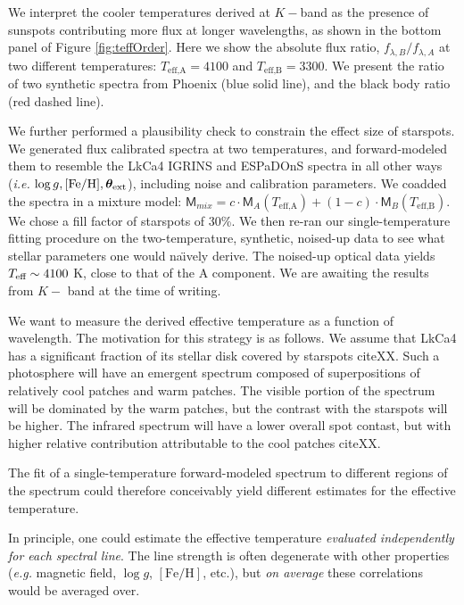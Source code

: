 \documentclass[onecolumn]{emulateapj}%
\begin{document}
We interpret the cooler temperatures derived at $K-$band as the presence of sunspots contributing more flux at longer wavelengths, as shown in the bottom panel of Figure \ref{fig:teffOrder}.  Here we show the absolute flux ratio, $f_{\lambda, B} / f_{\lambda, A}$ at two different temperatures: $T_\textrm{eff,A} = 4100$ and $T_\textrm{eff,B} = 3300$.  We present the ratio of two synthetic spectra from Phoenix (blue solid line), and the black body ratio (red dashed line).  

We further performed a plausibility check to constrain the effect size of starspots.  We generated flux calibrated spectra at two temperatures, and forward-modeled them to resemble the LkCa4 IGRINS and ESPaDOnS spectra in all other ways (\emph{i.e.} $\log g, [{\rm Fe}/{\rm H}], {\bm \theta}_{\rm ext}$), including noise and calibration parameters.  We coadded the spectra in a mixture model:  $ \mathsf{M}_{mix} = c \cdot \mathsf{M}_A(T_\textrm{eff,A}) + (1-c) \cdot \mathsf{M}_B(T_\textrm{eff,B})$.  We chose a fill factor of starspots of 30\%.  We then re-ran our single-temperature fitting procedure on the two-temperature, synthetic, noised-up data to see what stellar parameters one would na\"{\i}vely derive.  The noised-up optical data yields $T_\textrm{eff} \sim 4100$ K, close to that of the A component.  We are awaiting the results from $K-$ band at the time of writing.


We want to measure the derived effective temperature as a function of wavelength.  The motivation for this strategy is as follows.  We assume that LkCa4 has a significant fraction of its stellar disk covered by starspots citeXX.  Such a photosphere will have an emergent spectrum composed of superpositions of relatively cool patches and warm patches.  The visible portion of the spectrum will be dominated by the warm patches, but the contrast with the starspots will be higher.  The infrared spectrum will have a lower overall spot contast, but with higher relative contribution attributable to the cool patches citeXX.  

The fit of a single-temperature forward-modeled spectrum to different regions of the spectrum could therefore conceivably yield different estimates for the effective temperature.

In principle, one could estimate the effective temperature \emph{evaluated independently for each spectral line}.  The line strength is often degenerate with other properties (\emph{e.g.} magnetic field, $\log{g}$, $[\mathrm{Fe}/\mathrm{H}]$, etc.), but \emph{on average} these correlations would be averaged over.
\end{document}
